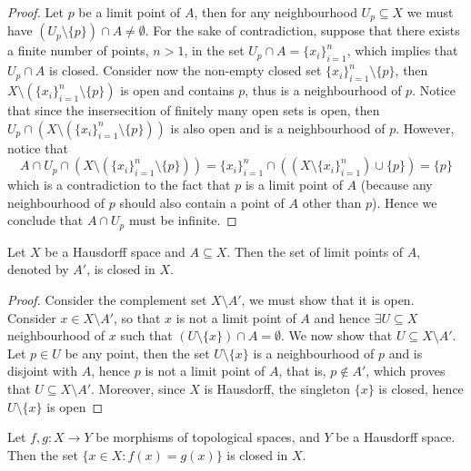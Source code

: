 \begin{proof}
  Let \(p\) be a limit point of \(A\), then for any neighbourhood \(U_p
  \subseteq X\) we must have \((U_p \setminus \{p\}) \cap A \neq \emptyset\).
  For the sake of contradiction, suppose that there exists a finite number of
  points, \(n > 1\), in the set \(U_p \cap A = \{x_i\}_{i=1}^n\), which implies
  that \(U_p \cap A\) is closed. Consider now the non-empty closed set
  \(\{x_i\}_{i=1}^n \setminus \{p\}\), then \(X \setminus (\{x_i\}_{i=1}^n
  \setminus \{p\})\) is open and contains \(p\), thus is a neighbourhood of
  \(p\). Notice that since the insersecition of finitely many open sets is open,
  then \(U_p \cap \left( X \setminus \left( \{x_i\}_{i=1}^n \setminus \{p\}
  \right) \right)\) is also open and is a neighbourhood of \(p\). However, notice
  that
  \[
    A \cap U_p \cap (X \setminus (\{x_i\}_{i=1}^n \setminus \{p\}))
    = \{x_i\}_{i=1}^n \cap ((X \setminus \{x_i\}_{i=1}^n) \cup \{p\})
    = \{p\} 
  \] 
  which is a contradiction to the fact that \(p\) is a limit point of \(A\)
  (because any neighbourhood of \(p\) should also contain a point of \(A\) other
  than \(p\)). Hence we conclude that \(A \cap U_p\) must be infinite.
\end{proof}

\begin{proposition}
  Let \(X\) be a Hausdorff space and \(A \subseteq X\). Then the set of limit
  points of \(A\), denoted by \(A'\), is closed in \(X\).
\end{proposition}

\begin{proof}
  Consider the complement set \(X \setminus A'\), we must show that it is open.
  Consider \(x \in X \setminus A'\), so that \(x\) is not a limit point of \(A\)
  and hence \(\exists U \subseteq X\) neighbourhood of \(x\) such that \((U
  \setminus \{x\}) \cap A = \emptyset\). We now show that \(U \subseteq X
  \setminus A'\). Let \(p \in U\) be any point, then the set \(U \setminus
  \{x\}\) is a neighbourhood of \(p\) and is disjoint with \(A\), hence \(p\) is
  not a limit point of \(A\), that is, \(p \not\in A'\), which proves that \(U
  \subseteq X \setminus A'\). Moreover, since \(X\) is Hausdorff, the singleton
  \(\{x\}\) is closed, hence \(U \setminus \{x\}\) is open
\end{proof}

\begin{proposition}
  Let \(f,g : X \to Y\) be morphisms of topological spaces, and \(Y\) be a
  Hausdorff space. Then the set \(\{x \in X : f(x) = g(x)\}\) is closed in
  \(X\).
\end{proposition}

